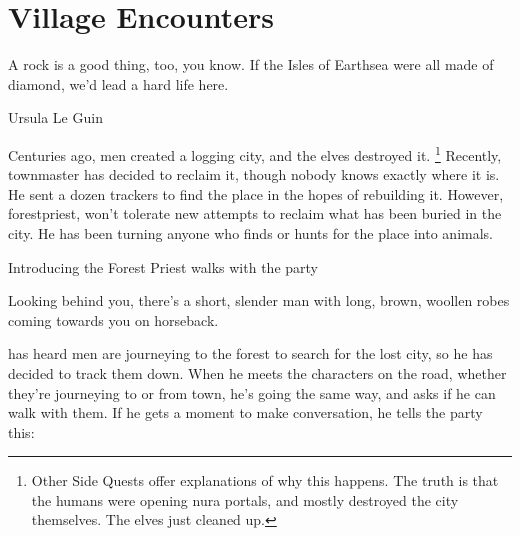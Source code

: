 \section{Village Encounters}


\epigraph{A rock is a good thing, too, you know. If the Isles of Earthsea were all made of diamond, we'd lead a hard life here.}{Ursula Le Guin}

\renewcommand{\sqarea}{Villages}

\setcounter{encnum}{1}
\renewcommand{\encsymbol}{\ding{170}}

\begin{multicols}{2}

\resumecontents[Town]
\resumecontents[Forest]

\label{herenofarther}

\stopcontents[Town]
\stopcontents[Forest]

\startcontents[sq]

\sqminitoc

\noindent
Centuries ago, men created a logging city, and the elves destroyed it.%
\footnote{Other Side Quests offer explanations of why this happens.
The truth is that the humans were opening nura portals, and mostly destroyed the city themselves.
The elves just cleaned up.} 
Recently, \gls{townmaster} has decided to reclaim it, though nobody knows exactly where it is.
He sent a dozen trackers to find the place in the hopes of rebuilding it.
However, \gls{forestpriest}, won't tolerate new attempts to reclaim what has been buried in the city.
He has been turning anyone who finds or hunts for the place into animals.

{Introducing the Forest Priest}%
{ walks with the party}%

\begin{boxtext}

  Looking behind you, there's a short, slender man with long, brown, woollen robes coming towards you on horseback.

\end{boxtext}

 has heard men are journeying to the forest to search for the lost city, so he has decided to track them down.
When he meets the characters on the road, whether they're journeying to or from \gls{town}, he's going the same way, and asks if he can walk with them.
If he gets a moment to make conversation, he tells the party this:


\end{multicols}
